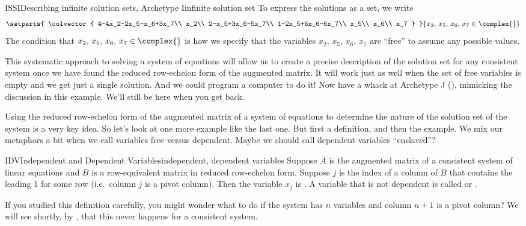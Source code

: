 \begin{example}{ISSI}{Describing infinite solution sets, Archetype I}{infinite solution set}
%
To express the solutions as a set, we write
\begin{equation*}
\setparts{
\colvector{
4-4x_2-2x_5-x_6+3x_7\\
x_2\\
2-x_5+3x_6-5x_7\\
1-2x_5+6x_6-6x_7\\
x_5\\
x_6\\
x_7
}
}{
x_2,\,x_5,\,x_6,\,x_7\in\complex{\null}
}
\end{equation*}
%
The condition that $x_2,\,x_5,\,x_6,\,x_7\in\complex{\null}$ is how we specify that the variables $x_2,\,x_5,\,x_6,\,x_7$ are ``free'' to assume any possible values.\par
%
This systematic approach to solving a system of equations will allow us to create a precise description of the solution set for any consistent system once we have found the reduced row-echelon form of the augmented matrix.  It will work just as well when the set of free variables is empty and we get just a single solution.  And we could program a computer to do it!  Now have a whack at Archetype J (), mimicking the discussion in this example.  We'll still be here when you get back.
\end{example}
%
Using the reduced row-echelon form of the augmented matrix of a system of equations to determine the nature of the solution set of the system is a very key idea.  So let's look at one more example like the last one.  But first a definition, and then the example.   We mix our metaphors a bit when we call variables free versus dependent.  Maybe we should call dependent variables ``enslaved''?
%
\begin{definition}{IDV}{Independent and Dependent Variables}{independent, dependent variables}
Suppose $A$ is the augmented matrix of a consistent system of linear equations and $B$ is a row-equivalent matrix in reduced row-echelon form.  Suppose $j$ is the index of a column of $B$ that contains the leading 1 for some row (i.e.\ column $j$ is a pivot column).  Then the variable $x_j$ is .  A variable that is not dependent is called  or .
\end{definition}
%
If you studied this definition carefully, you might wonder what to do if the system has $n$ variables and column $n+1$ is a pivot column?  We will see shortly, by , that this never happens for a consistent system.

